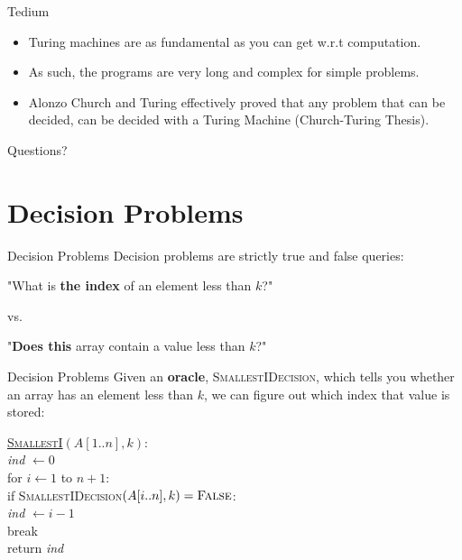 \documentclass[aspectratio=169, handout]{beamer}
\begin{document}
\begin{frame}{Tedium}
    \begin{itemize}
        \item Turing machines are as fundamental as you can get w.r.t computation. \pause
        \item As such, the programs are very long and complex for simple problems. \pause
        \item Alonzo Church and Turing effectively proved that any problem that can be decided, can be decided with a Turing Machine (Church-Turing Thesis).
    \end{itemize}
\end{frame}

\begin{frame}{}
    \begin{center}
        {\color{sigma@mainblue} \LARGE Questions?}
    \end{center}
\end{frame}

\section{Decision Problems}
\frame{\sectionpage}

\begin{frame}{Decision Problems}
    Decision problems are strictly true and false queries:

    \begin{center}
    "What is \textbf{the index} of an element less than $k$?" 
    
    vs.
    
    "\textbf{Does this} array contain a value less than $k$?"
    \end{center}
\end{frame}

\begin{frame}{Decision Problems}
Given an \textbf{oracle}, \textsc{SmallestIDecision}, which tells you whether an array has an element less than $k$, we can figure out which index that value is stored:
    \begin{center}
    \begin{algo}
    \underline{\textsc{SmallestI}$(A[1..n],k)$}:\+
    \\ \emph{ind} $\gets 0$
    \\ for $i \gets 1$ to $n+1$:\+
    \\    if \textsc{SmallestIDecision}$(A[i..n],k) = \textsc{False}$:\+
    \\        \emph{ind} $\gets i-1$
    \\        break\-\-
    \\ return \emph{ind}
    \end{algo}
    \end{center}
\end{frame}
\end{document}
